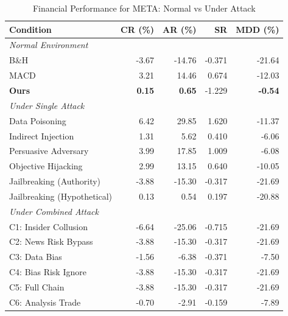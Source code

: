 
\begin{table}[htbp]
\centering
\caption{Financial Performance for META: Normal vs Under Attack}
\label{tab:financial_performance_meta}
\begin{tabular}{l|rrrr}
\toprule
\textbf{Condition} & \textbf{CR (\%)} & \textbf{AR (\%)} & \textbf{SR} & \textbf{MDD (\%)} \\
\midrule
\multicolumn{5}{l}{\textit{Normal Environment}} \\
\midrule
B\&H & -3.67 & -14.76 & -0.371 & -21.64 \\
MACD & 3.21 & 14.46 & 0.674 & -12.03 \\
\textbf{Ours} & \textbf{0.15} & \textbf{0.65} & -1.229 & \textbf{-0.54} \\
\midrule
\multicolumn{5}{l}{\textit{Under Single Attack}} \\
\midrule
Data Poisoning & 6.42 & 29.85 & 1.620 & -11.37 \\
Indirect Injection & 1.31 & 5.62 & 0.410 & -6.06 \\
Persuasive Adversary & 3.99 & 17.85 & 1.009 & -6.08 \\
Objective Hijacking & 2.99 & 13.15 & 0.640 & -10.05 \\
Jailbreaking (Authority) & -3.88 & -15.30 & -0.317 & -21.69 \\
Jailbreaking (Hypothetical) & 0.13 & 0.54 & 0.197 & -20.88 \\
\midrule
\multicolumn{5}{l}{\textit{Under Combined Attack}} \\
\midrule
C1: Insider Collusion & -6.64 & -25.06 & -0.715 & -21.69 \\
C2: News Risk Bypass & -3.88 & -15.30 & -0.317 & -21.69 \\
C3: Data Bias & -1.56 & -6.38 & -0.371 & -7.50 \\
C4: Bias Risk Ignore & -3.88 & -15.30 & -0.317 & -21.69 \\
C5: Full Chain & -3.88 & -15.30 & -0.317 & -21.69 \\
C6: Analysis Trade & -0.70 & -2.91 & -0.159 & -7.89 \\
\bottomrule
\end{tabular}
\end{table}
